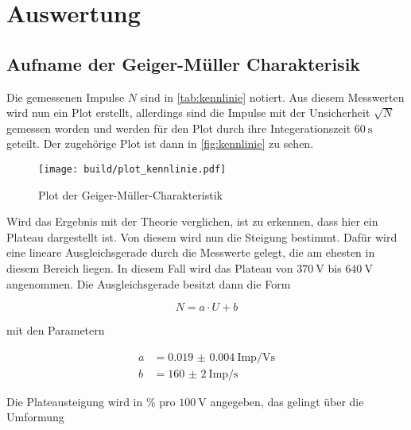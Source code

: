 \section{Auswertung}
\label{sec:Auswertung}



\subsection{Aufname der Geiger-Müller Charakterisik}
\label{ssec:a1}

Die gemessenen Impulse $N$ sind in \autoref{tab:kennlinie} notiert.
Aus diesem Messwerten wird nun ein Plot erstellt, allerdings sind die Impulse mit der Unsicherheit $\sqrt{N}$ gemessen worden und werden für den Plot durch ihre Integerationszeit $\SI{60}{\second}$ geteilt.
Der zugehörige Plot ist dann in \autoref{fig:kennlinie} zu sehen.

\begin{figure}
    \centering
    \texttt{[image: build/plot\_kennlinie.pdf]}
    \caption{Plot der Geiger-Müller-Charakteristik}
    \label{fig:kennlinie}
\end{figure}

Wird das Ergebnis mit der Theorie verglichen, ist zu erkennen, dass hier ein Plateau dargestellt ist.
Von diesem wird nun die Steigung bestimmt.
Dafür wird eine lineare Ausgleichsgerade durch die Messwerte gelegt, die am ehesten in diesem Bereich liegen.
In diesem Fall wird das Plateau von $\SI{370}{\volt}$ bis $\SI{640}{\volt}$ angenommen.
Die Ausgleichsgerade besitzt dann die Form

\begin{equation}
    N = a \cdot U + b
\end{equation}

mit den Parametern

\begin{align}
    a &= \SI{0.019(4)}{\text{Imp}\per\volt\second}\\
    b &= \SI{160(2)}{\text{Imp}\per\second}
\end{align}

Die Plateausteigung wird in $\%$ pro $\SI{100}{\volt}$ angegeben, das gelingt über die Umformung 

